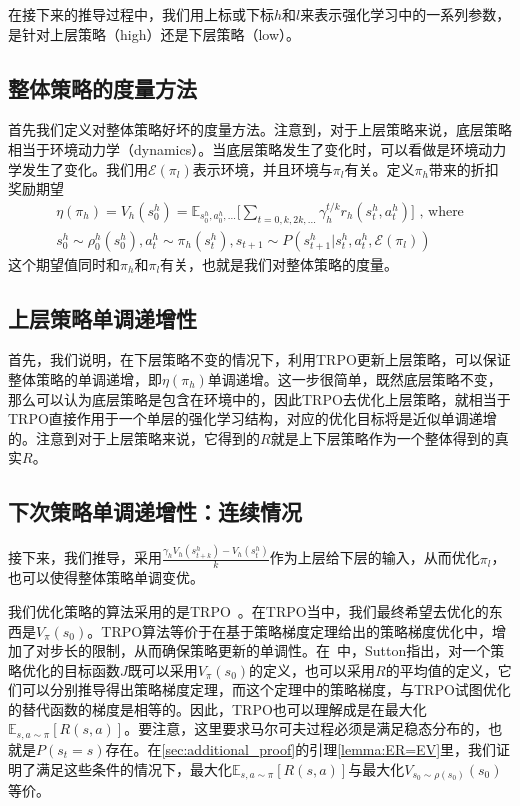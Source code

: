 在接下来的推导过程中，我们用上标或下标$h$和$l$来表示强化学习中的一系列参数，是针对上层策略（high）还是下层策略（low）。

\subsection{整体策略的度量方法}
首先我们定义对整体策略好坏的度量方法。注意到，对于上层策略来说，底层策略相当于环境动力学（dynamics）。当底层策略发生了变化时，可以看做是环境动力学发生了变化。我们用$\mathcal{E}(\pi_l)$表示环境，并且环境与$\pi_l$有关。定义$\pi_h$带来的折扣奖励期望
\begin{equation}
\begin{aligned}
  \eta(\pi_h) = V_h(s_0^h) = \mathbb{E}_{s_0^h, a_0^h, ...}\Bigg[\sum_{t = 0, k, 2k, ...} \gamma_h^{t/k} r_h(s_t^h, a_t^h)\Bigg] \text{ ,  where}   \\
  s_0^h \sim \rho_0^h(s_0^h), a_t^h \sim \pi_h(s_t^h), s_{t+1} \sim P(s_{t+1}^h|s_t^h, a_t^h, \mathcal{E}(\pi_l))
\end{aligned}
\end{equation}
这个期望值同时和$\pi_h$和$\pi_l$有关，也就是我们对整体策略的度量。

\subsection{上层策略单调递增性}
首先，我们说明，在下层策略不变的情况下，利用TRPO更新上层策略，可以保证整体策略的单调递增，即$\eta(\pi_h)$单调递增。这一步很简单，既然底层策略不变，那么可以认为底层策略是包含在环境中的，因此TRPO去优化上层策略，就相当于TRPO直接作用于一个单层的强化学习结构，对应的优化目标将是近似单调递增的。注意到对于上层策略来说，它得到的$R$就是上下层策略作为一个整体得到的真实$R$。

\subsection{下次策略单调递增性：连续情况}
接下来，我们推导，采用$ \frac{\gamma_h V_h(s_{t + k}^h) - V_h(s_{t}^h)}{k}$作为上层给下层的输入，从而优化$\pi_l$，也可以使得整体策略单调变优。

我们优化策略的算法采用的是TRPO~\cite{TRPO}。在TRPO当中，我们最终希望去优化的东西是$V_{\pi}(s_0)$。TRPO算法等价于在基于策略梯度定理给出的策略梯度优化中，增加了对步长的限制，从而确保策略更新的单调性。在~中，Sutton指出，对一个策略优化的目标函数$J$既可以采用$V_{\pi}(s_0)$的定义，也可以采用$R$的平均值的定义，它们可以分别推导得出策略梯度定理，而这个定理中的策略梯度，与TRPO试图优化的替代函数的梯度是相等的。因此，TRPO也可以理解成是在最大化$\mathbb{E}_{s, a \sim \pi}[R(s, a)]$。要注意，这里要求马尔可夫过程必须是满足稳态分布的，也就是$P(s_t = s)$存在。在\ref{sec:additional_proof}的引理\ref{lemma:ER=EV}里，我们证明了满足这些条件的情况下，最大化$\mathbb{E}_{s, a \sim \pi}[R(s, a)]$与最大化$V_{s_0 \sim \rho(s_0)}(s_0)$等价。


